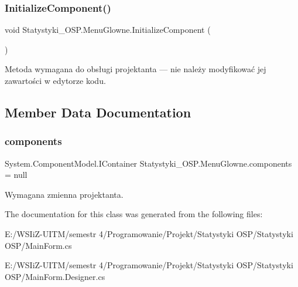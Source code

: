 \subsubsection{\texorpdfstring{InitializeComponent()}{InitializeComponent()}}
{\footnotesize\ttfamily void Statystyki\+\_\+\+O\+S\+P.\+Menu\+Glowne.\+Initialize\+Component (\begin{DoxyParamCaption}{ }\end{DoxyParamCaption})\hspace{0.3cm}{\ttfamily [private]}}



Metoda wymagana do obsługi projektanta — nie należy modyfikować jej zawartości w edytorze kodu. 



\subsection{Member Data Documentation}
\mbox{\label{class_statystyki___o_s_p_1_1_menu_glowne_a0f6fdc5f30828a9b3b5faca3598f0464}} 
\subsubsection{\texorpdfstring{components}{components}}
{\footnotesize\ttfamily System.\+Component\+Model.\+I\+Container Statystyki\+\_\+\+O\+S\+P.\+Menu\+Glowne.\+components = null\hspace{0.3cm}{\ttfamily [private]}}



Wymagana zmienna projektanta. 



The documentation for this class was generated from the following files\+:\begin{DoxyCompactItemize}
\item 
E\+:/\+W\+S\+Ii\+Z-\/\+U\+I\+T\+M/semestr 4/\+Programowanie/\+Projekt/\+Statystyki O\+S\+P/\+Statystyki O\+S\+P/Main\+Form.\+cs\item 
E\+:/\+W\+S\+Ii\+Z-\/\+U\+I\+T\+M/semestr 4/\+Programowanie/\+Projekt/\+Statystyki O\+S\+P/\+Statystyki O\+S\+P/Main\+Form.\+Designer.\+cs\end{DoxyCompactItemize}

